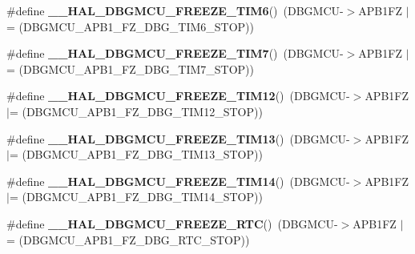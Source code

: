 \begin{DoxyCompactItemize}
\item 
\mbox{\label{group___h_a_l___exported___macros_gaccdcfde9ae6f78f0ca359776b021f87c}} 
\#define {\bfseries \+\_\+\+\_\+\+H\+A\+L\+\_\+\+D\+B\+G\+M\+C\+U\+\_\+\+F\+R\+E\+E\+Z\+E\+\_\+\+T\+I\+M6}()~(D\+B\+G\+M\+CU-\/$>$A\+P\+B1\+FZ $\vert$= (D\+B\+G\+M\+C\+U\+\_\+\+A\+P\+B1\+\_\+\+F\+Z\+\_\+\+D\+B\+G\+\_\+\+T\+I\+M6\+\_\+\+S\+T\+OP))
\item 
\mbox{\label{group___h_a_l___exported___macros_ga8541da9b4d428d41e218e9701e4307d1}} 
\#define {\bfseries \+\_\+\+\_\+\+H\+A\+L\+\_\+\+D\+B\+G\+M\+C\+U\+\_\+\+F\+R\+E\+E\+Z\+E\+\_\+\+T\+I\+M7}()~(D\+B\+G\+M\+CU-\/$>$A\+P\+B1\+FZ $\vert$= (D\+B\+G\+M\+C\+U\+\_\+\+A\+P\+B1\+\_\+\+F\+Z\+\_\+\+D\+B\+G\+\_\+\+T\+I\+M7\+\_\+\+S\+T\+OP))
\item 
\mbox{\label{group___h_a_l___exported___macros_ga2bbe99ec741228b520e17b1bf38eb2ad}} 
\#define {\bfseries \+\_\+\+\_\+\+H\+A\+L\+\_\+\+D\+B\+G\+M\+C\+U\+\_\+\+F\+R\+E\+E\+Z\+E\+\_\+\+T\+I\+M12}()~(D\+B\+G\+M\+CU-\/$>$A\+P\+B1\+FZ $\vert$= (D\+B\+G\+M\+C\+U\+\_\+\+A\+P\+B1\+\_\+\+F\+Z\+\_\+\+D\+B\+G\+\_\+\+T\+I\+M12\+\_\+\+S\+T\+OP))
\item 
\mbox{\label{group___h_a_l___exported___macros_ga21bfaea50e429031982861b2869c6863}} 
\#define {\bfseries \+\_\+\+\_\+\+H\+A\+L\+\_\+\+D\+B\+G\+M\+C\+U\+\_\+\+F\+R\+E\+E\+Z\+E\+\_\+\+T\+I\+M13}()~(D\+B\+G\+M\+CU-\/$>$A\+P\+B1\+FZ $\vert$= (D\+B\+G\+M\+C\+U\+\_\+\+A\+P\+B1\+\_\+\+F\+Z\+\_\+\+D\+B\+G\+\_\+\+T\+I\+M13\+\_\+\+S\+T\+OP))
\item 
\mbox{\label{group___h_a_l___exported___macros_gaf4d10c15c1644eeff138829af21c219c}} 
\#define {\bfseries \+\_\+\+\_\+\+H\+A\+L\+\_\+\+D\+B\+G\+M\+C\+U\+\_\+\+F\+R\+E\+E\+Z\+E\+\_\+\+T\+I\+M14}()~(D\+B\+G\+M\+CU-\/$>$A\+P\+B1\+FZ $\vert$= (D\+B\+G\+M\+C\+U\+\_\+\+A\+P\+B1\+\_\+\+F\+Z\+\_\+\+D\+B\+G\+\_\+\+T\+I\+M14\+\_\+\+S\+T\+OP))
\item 
\mbox{\label{group___h_a_l___exported___macros_ga6ea586c594feb6eb0f2aba52f1c69f4c}} 
\#define {\bfseries \+\_\+\+\_\+\+H\+A\+L\+\_\+\+D\+B\+G\+M\+C\+U\+\_\+\+F\+R\+E\+E\+Z\+E\+\_\+\+R\+TC}()~(D\+B\+G\+M\+CU-\/$>$A\+P\+B1\+FZ $\vert$= (D\+B\+G\+M\+C\+U\+\_\+\+A\+P\+B1\+\_\+\+F\+Z\+\_\+\+D\+B\+G\+\_\+\+R\+T\+C\+\_\+\+S\+T\+OP))

\end{DoxyCompactItemize}
